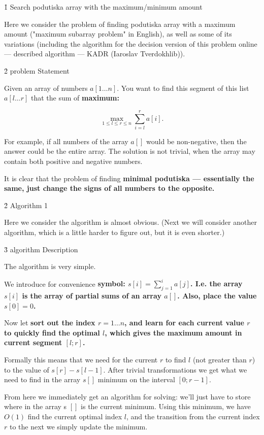 \h1{ Search podutiska array with the maximum/minimum amount }

Here we consider the problem of finding podutiska array with a maximum amount ("maximum subarray problem" in English), as well as some of its variations (including the algorithm for the decision version of this problem online --- described algorithm --- KADR (Iaroslav Tverdokhlib)).


\h2{ problem Statement }

Given an array of numbers $a[1 \ldots n]$. You want to find this segment of this list $a[l \ldots r]$ that the sum of \bf{maximum}:

$$ \max_{ 1 \le l \le r \le n } \sum_{i=l}^{r} a[i]. $$

For example, if all numbers of the array $a[]$ would be non-negative, then the answer could be the entire array. The solution is not trivial, when the array may contain both positive and negative numbers.

It is clear that the problem of finding \bf{minimal} podutiska --- essentially the same, just change the signs of all numbers to the opposite.


\h2{ Algorithm 1 }

Here we consider the algorithm is almost obvious. (Next we will consider another algorithm, which is a little harder to figure out, but it is even shorter.)

\h3{ algorithm Description }

The algorithm is very simple.

We introduce for convenience \bf{symbol}: $s[i] = \sum_{j=1}^{i} a[j]$. I.e. the array $s[i]$ is the array of partial sums of an array $a[]$. Also, place the value $s[0] = 0$.

Now let \bf{sort out} the index $r = 1 \ldots n$, and learn for each current value $r$ to quickly find the optimal $l$, which gives the maximum amount in current segment $[l; r]$.

Formally this means that we need for the current $r$ to find $l$ (not greater than $r$) to the value of $s[r] - s[l-1]$. After trivial transformations we get what we need to find in the array $s[]$ minimum on the interval $[0;r-1]$.

From here we immediately get an algorithm for solving: we'll just have to store where in the array s $[]$ is the current minimum. Using this minimum, we have $O(1)$ find the current optimal index $l$, and the transition from the current index $r$ to the next we simply update the minimum.


